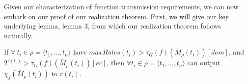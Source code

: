  Given our characterization of function transmission requirements, we can now embark on our proof of our realization theorem. First, we will give our key underlying lemma, lemma 3, from which our realization theorem follows naturally.

\begin{lemma} 
\label{lemma:core-lemma}
If $\forall\ t_i \in \rho = \langle t_1, ..., t_n \rangle$ have $maxRules(t_i) > \tau_G(f)(\bar{M}_\rho(t_i))[dom]$, and $2^{r(t_i)} > \tau_G(f)(\bar{M}_\rho(t_i))[ec]$, then $\forall t_i \in \rho = \langle t_1, ..., t_n \rangle$ can output $\chi_f(\bar{M}_\rho(t_i))$ to $r(t_i)$.
\end{lemma}
%
%
%
%
%
%
